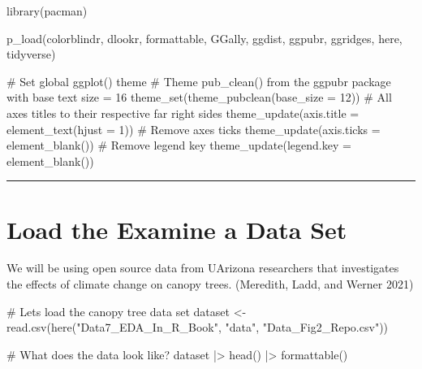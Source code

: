 \documentclass[
  letterpaper,
  DIV=11,
  numbers=noendperiod]{scrreprt}
\newenvironment{Shaded}{\begin{snugshade}}{\end{snugshade}}
\newcommand{\AttributeTok}[1]{\textcolor[rgb]{0.40,0.45,0.13}{#1}}
\newcommand{\CommentTok}[1]{\textcolor[rgb]{0.37,0.37,0.37}{#1}}
\newcommand{\DecValTok}[1]{\textcolor[rgb]{0.68,0.00,0.00}{#1}}
\newcommand{\FunctionTok}[1]{\textcolor[rgb]{0.28,0.35,0.67}{#1}}
\newcommand{\NormalTok}[1]{\textcolor[rgb]{0.00,0.23,0.31}{#1}}
\newcommand{\OtherTok}[1]{\textcolor[rgb]{0.00,0.23,0.31}{#1}}
\newcommand{\SpecialCharTok}[1]{\textcolor[rgb]{0.37,0.37,0.37}{#1}}
\newcommand{\StringTok}[1]{\textcolor[rgb]{0.13,0.47,0.30}{#1}}
\begin{document}
\begin{Shaded}
\begin{Highlighting}[]
\FunctionTok{library}\NormalTok{(pacman)}

\FunctionTok{p\_load}\NormalTok{(colorblindr,}
\NormalTok{       dlookr,}
\NormalTok{       formattable,}
\NormalTok{       GGally,}
\NormalTok{       ggdist,}
\NormalTok{       ggpubr,}
\NormalTok{       ggridges,}
\NormalTok{       here,}
\NormalTok{       tidyverse)}

\CommentTok{\# Set global ggplot() theme}
\CommentTok{\# Theme pub\_clean() from the ggpubr package with base text size = 16}
\FunctionTok{theme\_set}\NormalTok{(}\FunctionTok{theme\_pubclean}\NormalTok{(}\AttributeTok{base\_size =} \DecValTok{12}\NormalTok{)) }
\CommentTok{\# All axes titles to their respective far right sides}
\FunctionTok{theme\_update}\NormalTok{(}\AttributeTok{axis.title =} \FunctionTok{element\_text}\NormalTok{(}\AttributeTok{hjust =} \DecValTok{1}\NormalTok{))}
\CommentTok{\# Remove axes ticks}
\FunctionTok{theme\_update}\NormalTok{(}\AttributeTok{axis.ticks =} \FunctionTok{element\_blank}\NormalTok{()) }
\CommentTok{\# Remove legend key}
\FunctionTok{theme\_update}\NormalTok{(}\AttributeTok{legend.key =} \FunctionTok{element\_blank}\NormalTok{())}
\end{Highlighting}
\end{Shaded}

\begin{center}\rule{0.5\linewidth}{0.5pt}\end{center}

\hypertarget{load-the-examine-a-data-set}{%
\section{Load the Examine a Data
Set}\label{load-the-examine-a-data-set}}

We will be using open source data from UArizona researchers that
investigates the effects of climate change on canopy trees. (Meredith,
Ladd, and Werner 2021)

\begin{Shaded}
\begin{Highlighting}[]
\CommentTok{\# Let\textquotesingle{}s load the canopy tree data set}
\NormalTok{dataset }\OtherTok{\textless{}{-}} \FunctionTok{read.csv}\NormalTok{(}\FunctionTok{here}\NormalTok{(}\StringTok{"Data7\_EDA\_In\_R\_Book"}\NormalTok{, }\StringTok{"data"}\NormalTok{, }\StringTok{"Data\_Fig2\_Repo.csv"}\NormalTok{))}

\CommentTok{\# What does the data look like?}
\NormalTok{dataset }\SpecialCharTok{|\textgreater{}}
  \FunctionTok{head}\NormalTok{() }\SpecialCharTok{|\textgreater{}}
  \FunctionTok{formattable}\NormalTok{()}
\end{Highlighting}
\end{Shaded}
\end{document}
